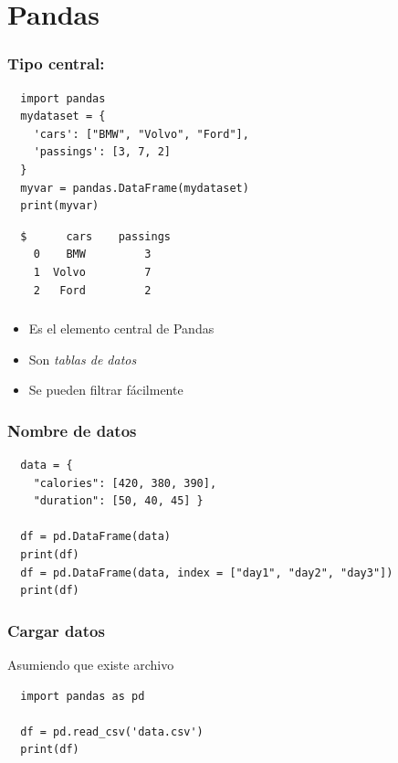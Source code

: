 \documentclass[14pt,aspectratio=169,xcolor=dvipsnames]{beamer}
\begin{document}
\section{Pandas}
\begin{frame}[fragile]\frametitle{Tipo central: }
    \begin{verbatim}
  import pandas
  mydataset = {
    'cars': ["BMW", "Volvo", "Ford"],
    'passings': [3, 7, 2]
  }
  myvar = pandas.DataFrame(mydataset)
  print(myvar) 
    \end{verbatim}

    \begin{verbatim}
  $      cars    passings
    0    BMW         3
    1  Volvo         7
    2   Ford         2
    \end{verbatim}
\end{frame}
\begin{frame}\frametitle{}
    \begin{itemize}
        \item Es el elemento central de Pandas
        \item Son \emph{tablas de datos}
        \item Se pueden filtrar fácilmente
    \end{itemize}
\end{frame}
\begin{frame}[fragile]\frametitle{Nombre de datos}

    \begin{verbatim}
  data = {
    "calories": [420, 380, 390],
    "duration": [50, 40, 45] }

  df = pd.DataFrame(data)
  print(df) 
  df = pd.DataFrame(data, index = ["day1", "day2", "day3"])
  print(df) 
    \end{verbatim}
\end{frame}
\begin{frame}[fragile]\frametitle{Cargar datos}

    Asumiendo que existe archivo 
    \begin{verbatim}
  import pandas as pd

  df = pd.read_csv('data.csv')
  print(df)
    \end{verbatim}

\end{frame}
\end{document}
